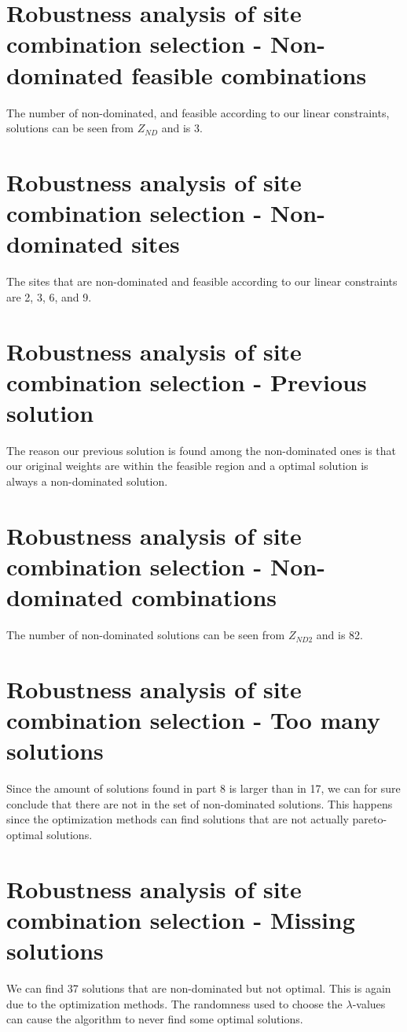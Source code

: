 \documentclass{article}
\begin{document}
\section{Robustness analysis of site combination selection - Non-dominated feasible combinations}
The number of non-dominated, and feasible according to our linear constraints, solutions can be seen from $Z_{ND}$ and is 3.
\section{Robustness analysis of site combination selection - Non-dominated sites}
The sites that are non-dominated and feasible according to our linear constraints are 2, 3, 6, and 9. 
\section{Robustness analysis of site combination selection - Previous solution}
The reason our previous solution is found among the non-dominated ones is that our original weights are within the feasible region and a optimal solution is always a non-dominated solution. 
\section{Robustness analysis of site combination selection - Non-dominated combinations}
The number of non-dominated solutions can be seen from $Z_{ND2}$ and is 82.
\section{Robustness analysis of site combination selection - Too many solutions}
Since the amount of solutions found in part 8 is larger than in 17, we can for sure conclude that there are not in the set of non-dominated solutions. This happens since the optimization methods can find solutions that are not actually pareto-optimal solutions. 
\section{Robustness analysis of site combination selection - Missing solutions}
We can find 37 solutions that are non-dominated but not optimal. This is again due to the optimization methods. The randomness used to choose the $\lambda$-values can cause the algorithm to never find some optimal solutions.
\end{document}
